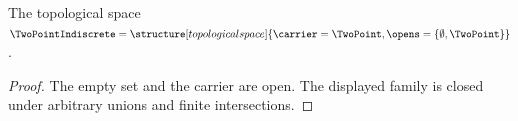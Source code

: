 
\begin{instance}\label{style_two_point_indiscrete_space}
    The topological space
    $\TwoPointIndiscrete=
        \structure[topological space]{
            \carrier=\TwoPoint,
            \opens=\{\emptyset,\TwoPoint\}
        }$.
\end{instance}
\begin{proof}
    The empty set and the carrier are open. The displayed family is closed
    under arbitrary unions and finite intersections.
\end{proof}
